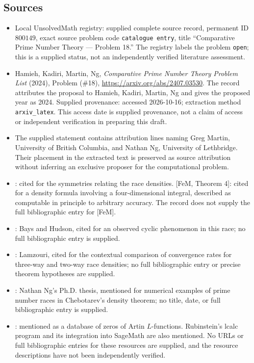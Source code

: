 \documentclass[11pt]{article}
\begin{document}
\subsection{Sources}
\begin{itemize}
\item Local UnsolvedMath registry: supplied complete source record, permanent ID \(800149\), exact source problem code \texttt{catalogue entry}, title ``Comparative Prime Number Theory --- Problem 18.'' The registry labels the problem \texttt{open}; this is a supplied status, not an independently verified literature assessment.
\item Hamieh, Kadiri, Martin, Ng, \emph{Comparative Prime Number Theory Problem List} (2024), Problem (\#18), \url{https://arxiv.org/abs/2407.03530}. The record attributes the proposal to Hamieh, Kadiri, Martin, Ng and gives the proposed year as 2024. Supplied provenance: accessed 2026-10-16; extraction method \texttt{arxiv\_latex}. This access date is supplied provenance, not a claim of access or independent verification in preparing this draft.
\item The supplied statement contains attribution lines naming Greg Martin, University of British Columbia, and Nathan Ng, University of Lethbridge. Their placement in the extracted text is preserved as source attribution without inferring an exclusive proposer for the computational problem.
\item [FeM, Theorem 2]: cited for the symmetries relating the race densities. [FeM, Theorem 4]: cited for a density formula involving a four-dimensional integral, described as computable in principle to arbitrary accuracy. The record does not supply the full bibliographic entry for [FeM].
\item [BH]: Bays and Hudson, cited for an observed cyclic phenomenon in this race; no full bibliographic entry is supplied.
\item [Lam]: Lamzouri, cited for the contextual comparison of convergence rates for three-way and two-way race densities; no full bibliographic entry or precise theorem hypotheses are supplied.
\item [NgPhd]: Nathan Ng's Ph.D. thesis, mentioned for numerical examples of prime number races in Chebotarev's density theorem; no title, date, or full bibliographic entry is supplied.
\item [LMFDB]: mentioned as a database of zeros of Artin \(L\)-functions. Rubinstein's lcalc program and its integration into SageMath are also mentioned. No URLs or full bibliographic entries for these resources are supplied, and the resource descriptions have not been independently verified.
\end{itemize}
\end{document}
